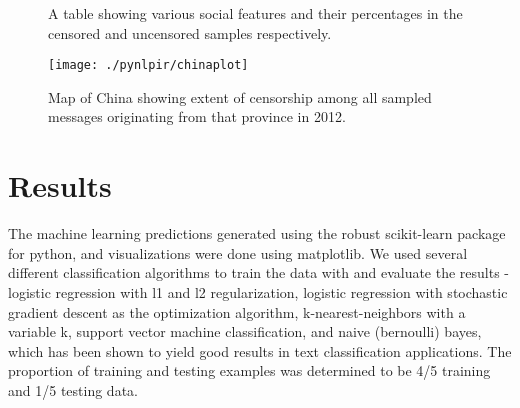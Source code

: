 \documentclass{article} %
\begin{document}
\begin{CJK*}{UTF8}{gbsn}
\begin{figure}[!htb]
\begin{center}
\begin{tabular}{ | l | l | l |}
		    \end{tabular}
	\end{center}
\caption{A table showing various social features and their percentages in the censored and uncensored samples respectively.}
\vspace{-10pt}
\end{figure}

\begin{figure}[!htb]
	\begin{center}
	\texttt{[image: ./pynlpir/chinaplot]}
	\end{center}
\caption{Map of China showing extent of censorship among all sampled messages originating from that province in 2012.}
\vspace{-10pt}
\end{figure}

\section{Results}

The machine learning predictions generated using the robust scikit-learn package for python, and visualizations were done using matplotlib. We used several different classification algorithms to train the data with and evaluate the results - logistic regression with l1 and l2 regularization, logistic regression with stochastic gradient descent as the optimization algorithm, k-nearest-neighbors with a variable k, support vector machine classification, and naive (bernoulli) bayes, which has been shown to yield good results in text classification applications. The proportion of training and testing examples was determined to be 4/5 training and 1/5 testing data. 


\end{CJK*}
\end{document}
